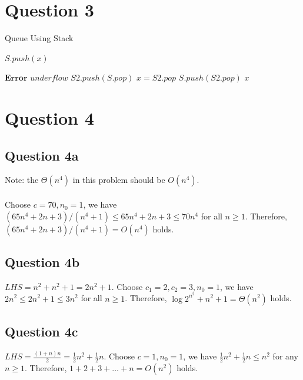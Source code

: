 \documentclass[11pt]{article}
\begin{document}
\newpage
\section{Question 3}
\label{q3}
\begin{algorithm}
\caption{Queue Using Stack}

\begin{algorithmic}[1]
	\State $S.push(x)$
\EndProcedure
\end{algorithmic}
\begin{algorithmic}[1]
	\State $\textbf{Error}$ $underflow$
	\EndIf
		\State $S2.push(S.pop)$
	\EndWhile
	\State $x = S2.pop$
		\State $S.push(S2.pop)$
	\EndWhile
	\State \Return $x$
\EndProcedure
\end{algorithmic}
\end{algorithm}

\section{Question 4}
\label{q4}
\subsection{Question 4a}
\label{q4a}
Note: the $\Theta(n^4)$ in this problem should be $O(n^4)$.\\\\
Choose $c = 70, n_0 = 1$, we have $(65n^4 + 2n + 3) / (n^4 + 1) \leq 65n^4 + 2n + 3 \leq 70n^4$ for all $n \geq 1$. Therefore, $(65n^4 + 2n + 3) / (n^4 + 1) = O(n^4)$ holds.


\subsection{Question 4b}
\label{q4b}
$LHS = n^2 + n^2 + 1 = 2n^2 + 1$.
Choose $c_1 = 2, c_2 = 3, n_0 = 1$, we have $2n^2 \leq 2n^2 + 1 \leq 3n^2$ for all $n \geq 1$. Therefore, $\log 2^{n^2} + n^2 + 1 = \Theta(n^2)$ holds.

\subsection{Question 4c}
\label{q4c}
$LHS = \frac{(1+n)n}{2} = \frac{1}{2}n^2 + \frac{1}{2}n$.
Choose $c = 1, n_0 = 1$, we have $\frac{1}{2}n^2 + \frac{1}{2}n \leq n^2$ for any $n \geq 1$.
Therefore, $1 + 2 + 3 + \ldots + n = O(n^2)$ holds.
\end{document}
